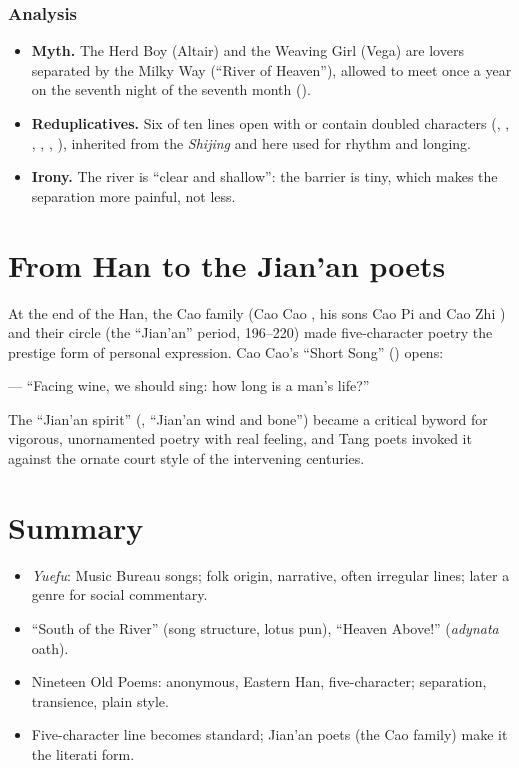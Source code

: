 \subsubsection{Analysis}
\begin{itemize}
  \item \textbf{Myth.} The Herd Boy (Altair) and the Weaving Girl (Vega) are lovers
        separated by the Milky Way (``River of Heaven''), allowed to meet once a year on
        the seventh night of the seventh month ().
  \item \textbf{Reduplicatives.} Six of ten lines open with or contain doubled characters
        (, , , , , ),
        inherited from the \emph{Shijing} and here used for rhythm and longing.
  \item \textbf{Irony.} The river is ``clear and shallow'': the barrier is tiny, which makes
        the separation more painful, not less.
\end{itemize}

\section{From Han to the Jian'an poets}

At the end of the Han, the Cao family (Cao Cao , his sons Cao Pi and Cao Zhi
) and their circle (the ``Jian'an'' period, 196--220) made five-character poetry
the prestige form of personal expression. Cao Cao's ``Short Song'' () opens:

\begin{center}
 --- ``Facing wine, we should sing: how long is a man's life?''
\end{center}

\begin{aside}
The ``Jian'an spirit'' (, ``Jian'an wind and bone'') became a critical
byword for vigorous, unornamented poetry with real feeling, and Tang poets invoked it
against the ornate court style of the intervening centuries.
\end{aside}

\section*{Summary}
\begin{itemize}
  \item \emph{Yuefu}: Music Bureau songs; folk origin, narrative, often irregular lines;
        later a genre for social commentary.
  \item ``South of the River'' (song structure, lotus pun), ``Heaven Above!''
        (\emph{adynata} oath).
  \item Nineteen Old Poems: anonymous, Eastern Han, five-character; separation, transience,
        plain style.
  \item Five-character line becomes standard; Jian'an poets (the Cao family) make it the
        literati form.
\end{itemize}
